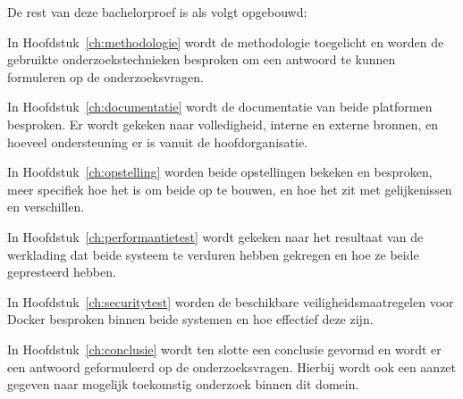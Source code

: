 
De rest van deze bachelorproef is als volgt opgebouwd:

In Hoofdstuk~\ref{ch:methodologie} wordt de methodologie toegelicht en worden de gebruikte onderzoekstechnieken besproken om een antwoord te kunnen formuleren op de onderzoeksvragen.

In Hoofdstuk~\ref{ch:documentatie} wordt de documentatie van beide platformen besproken. Er wordt gekeken naar volledigheid, interne en externe bronnen, en hoeveel ondersteuning er is vanuit de hoofdorganisatie.

In Hoofdstuk~\ref{ch:opstelling} worden beide opstellingen bekeken en besproken, meer specifiek hoe het is om beide op te bouwen, en hoe het zit met gelijkenissen en verschillen.

In Hoofdstuk~\ref{ch:performantietest} wordt gekeken naar het resultaat van de werklading dat beide systeem te verduren hebben gekregen en hoe ze beide gepresteerd hebben.

In Hoofdstuk~\ref{ch:securitytest} worden de beschikbare veiligheidsmaatregelen voor Docker besproken binnen beide systemen en hoe effectief deze zijn.

In  Hoofdstuk~\ref{ch:conclusie} wordt ten slotte een conclusie gevormd en wordt er een antwoord geformuleerd op de onderzoeksvragen. Hierbij wordt ook een aanzet gegeven naar mogelijk toekomstig onderzoek binnen dit domein.

